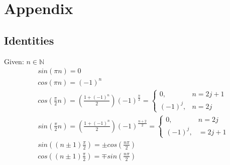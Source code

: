 \vfill\null %
\columnbreak
\section{Appendix}
\subsection{Identities}
Given: $n \in \mathbb{N}$
\begin{align*}
    &sin(\pi n) = 0 \\
    &cos(\pi n) = (-1)^n \\
    &cos(\frac{\pi}{2}n)=\left(\frac{1+(-1)^n}{2}\right)(-1)^{\frac{n}{2}}= \begin{cases} 0, &n=2j+1 \\ (-1)^j, &n=2j \end{cases}\\
	&sin(\frac{\pi}{2}n)=\left(\frac{1 + (-1)^n}{2}\right)(-1)^{\frac{n+2}{2}}= \begin{cases} 0, &n=2j \\ (-1)^j,&=2j+1 \end{cases}\\
    &sin\left(\left(n\pm 1\right)\frac{\pi}{2}\right)=\pm cos\left(\frac{n\pi}{2}\right)\\
    &cos\left(\left(n\pm1\right)\frac{\pi}{2}\right)= \mp sin\left(\frac{n\pi}{2}\right)\\
\end{align*}

